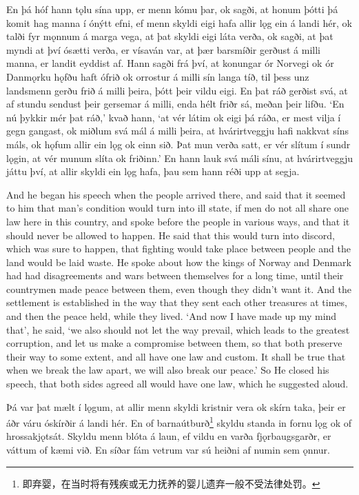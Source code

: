 \begin{paracol}{2}
    En þá hóf hann tǫlu sína upp, er menn kómu þar, ok sagði, at honum þótti þá komit hag manna í ónýtt efni, ef menn skyldi eigi hafa allir lǫg ein á landi hér, ok talði fyr mǫnnum á marga vega, at þat skyldi eigi láta verða, ok sagði, at þat myndi at því ósætti verða, er vísaván var, at þær bar\-smíðir gerðust á milli manna, er landit eyddist af. Hann sagði frá því, at konungar ór Norvegi ok ór Danmǫrku hǫfðu haft ófrið ok orrostur á milli sín langa tíð, til þess unz landsmenn gerðu frið á milli þeira, þótt þeir vildu eigi. En þat ráð gerðist svá, at af stundu sendust þeir gersemar á milli, enda hélt friðr sá, meðan þeir lifðu. `En nú þykkir mér þat ráð,' kvað hann, `at vér látim ok eigi þá ráða, er mest vilja í gegn gangast, ok miðlum svá mál á milli þeira, at hvárirtveggju hafi nakkvat síns máls, ok hǫfum allir ein lǫg ok einn sið. Þat mun verða satt, er vér slítum í sundr lǫgin, at vér munum slíta ok friðinn.' En hann lauk svá máli sínu, at hvárirtveggju játtu því, at allir skyldi ein lǫg hafa, þau sem hann réði upp at segja.
    \switchcolumn

    And he began his speech when the people arrived there, and said that it seemed to him that man's condition would turn into ill state, if men do not all share one law here in this country, and spoke before the people in various ways, and that it should never be allowed to happen. He said that this would turn into discord, which was sure to happen, that fighting would take place between people and the land would be laid waste. He spoke about how the kings of Norway and Denmark had had disagreements and wars between themselves for a long time, until their countrymen made peace between them, even though they didn't want it. And the settlement is established in the way that they sent each other treasures at times, and then the peace held, while they lived. `And now I have made up my mind that', he said, `we also should not let the way prevail, which leads to the greatest corruption, and let us make a compromise between them, so that both preserve their way to some extent, and all have one law and custom. It shall be true that when we break the law apart, we will also break our peace.' So He closed his speech, that both sides agreed all would have one law, which he suggested aloud.
    \switchcolumn*

    Þá var þat mælt í lǫgum, at allir menn skyldi kristnir vera ok skírn taka, þeir er áðr váru óskírðir á landi hér. En of barnaútburð\footnote{即弃婴，在当时将有残疾或无力抚养的婴儿遗弃一般不受法律处罚。} skyldu standa in fornu lǫg ok of hrossakjǫtsát. Skyldu menn blóta á laun, ef vildu en varða fjǫrbaugsgarðr, er váttum of kæmi við. En síðar fám vetrum var sú heiðni af numin sem ǫnnur.
    \switchcolumn


\end{paracol}
